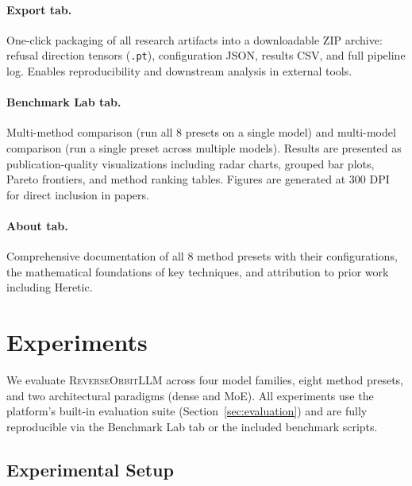 \documentclass[11pt]{article}
\begin{document}
\paragraph{Export tab.}
One-click packaging of all research artifacts into a downloadable ZIP archive: refusal direction tensors (\texttt{.pt}), configuration JSON, results CSV, and full pipeline log. Enables reproducibility and downstream analysis in external tools.

\paragraph{Benchmark Lab tab.}
Multi-method comparison (run all 8 presets on a single model) and multi-model comparison (run a single preset across multiple models). Results are presented as publication-quality visualizations including radar charts, grouped bar plots, Pareto frontiers, and method ranking tables. Figures are generated at 300 DPI for direct inclusion in papers.

\paragraph{About tab.}
Comprehensive documentation of all 8 method presets with their configurations, the mathematical foundations of key techniques, and attribution to prior work including Heretic.

\section{Experiments}
\label{sec:experiments}

We evaluate \textsc{ReverseOrbitLLM} across four model families, eight method presets, and two architectural paradigms (dense and MoE). All experiments use the platform's built-in evaluation suite (Section~\ref{sec:evaluation}) and are fully reproducible via the Benchmark Lab tab or the included benchmark scripts.

\subsection{Experimental Setup}
\label{sec:exp_setup}
\end{document}
